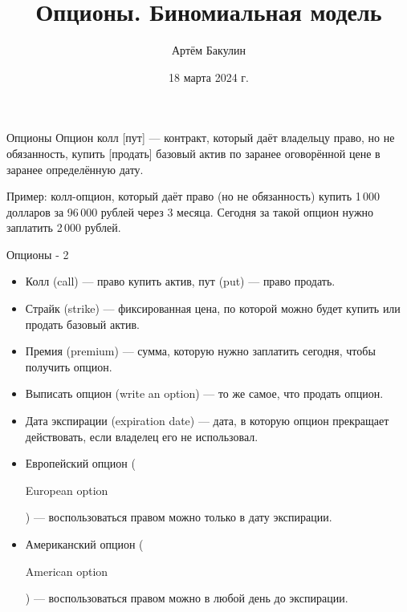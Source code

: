 \documentclass{beamer}
\title{Опционы. Биномиальная модель}
\author{Артём Бакулин}
\date{18 марта 2024 г.}
\newcommand{\en}[1]{\begin{otherlanguage}{english}#1\end{otherlanguage}}
\newcommand{\usdrubstrike}{96}
\begin{document}
\begin{frame}
\titlepage
\end{frame}



\begin{frame}{Опционы}
\justifying
\alert{Опцион колл [пут]} --- контракт, который даёт владельцу право, но не обязанность, купить [продать] базовый актив по заранее оговорённой цене в заранее определённую дату. 

\justify
Пример: колл-опцион, который даёт право (но не обязанность) купить 1\,000 долларов за \usdrubstrike\,000 рублей через 3 месяца. Сегодня за такой опцион нужно заплатить 2\,000 рублей.
\end{frame}



\begin{frame}{Опционы - 2}
\begin{itemize}
\justifying
\item \alert{Колл} (call) --- право купить актив, \alert{пут} (put) --- право продать.
\item \alert{Страйк} (strike) --- фиксированная цена, по которой можно будет купить или продать базовый актив.
\item \alert{Премия} (premium) --- сумма, которую нужно заплатить сегодня, чтобы получить опцион.
\item \alert{Выписать} опцион (write an option) --- то же самое, что продать опцион.
\item \alert{Дата экспирации} (expiration date) --- дата, в которую опцион прекращает действовать, если владелец его не использовал.
\item \alert{Европейский} опцион (\en{European option}) --- воспользоваться правом можно только в дату экспирации.
\item \alert{Американский} опцион (\en{American option}) --- воспользоваться правом можно в любой день до экспирации.
\end{itemize}
\end{frame}



\newcommand{\circlewithtext}[3]{
    \node[circle, fill, inner sep = 1.5pt] at (#1, #2) {};
    \node[anchor = north] at (#1, #2) {#3};
}
\end{document}
